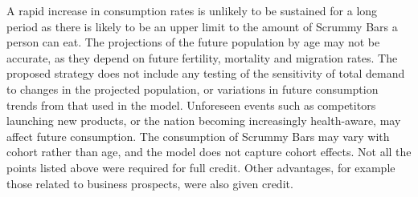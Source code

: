 A rapid increase in consumption rates is unlikely to be sustained
for a long period as there is likely to be an upper limit to
the amount of Scrummy Bars a person can eat.
The projections of the future population by age may not be accurate, as
they depend on future fertility, mortality and migration rates.
The proposed strategy does not include any testing of the
sensitivity of total demand to changes in the projected population,
or variations in future consumption trends from that used in the model.
Unforeseen events such as competitors launching new products, or the nation
becoming increasingly health-aware, may affect future consumption.
The consumption of Scrummy Bars may vary with cohort rather than age, and
the model does not capture cohort effects.
Not all the points listed above were required for full credit. Other advantages, for example
those related to business prospects, were also given credit.
